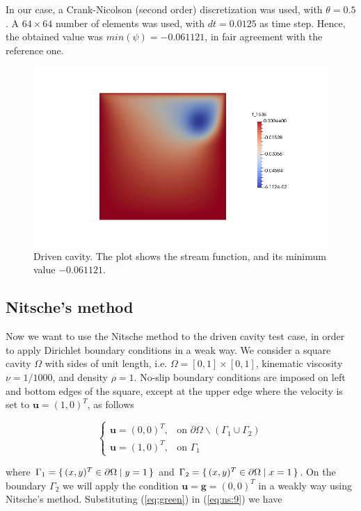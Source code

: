 \documentclass[11pt,a4paper,titlepage]{report}
\begin{document}
In our case, a Crank-Nicolson (second order) discretization was used, with $\theta = 0.5$. A $64 \times 64$ number of elements was used, with $dt = 0.0125$ as time step. Hence, the obtained value was $min(\psi) = -0.061 121$, in fair agreement with the reference one. \\

\vspace{-.3cm}
\begin{figure}[ht]
\centering
\includegraphics[width=\textwidth]{images/mine.png}
\vspace{-1cm}
\caption{Driven cavity. The plot shows the stream function, and its minimum value $-0.061 121$.}
\end{figure}


\subsection{Nitsche's method}
Now we want to use the Nitsche method to the driven cavity test case, in order to apply Dirichlet boundary conditions in a weak way. We consider a square cavity $\Omega$ with sides of unit length, i.e. $\Omega = [0,1] \times [0,1]$, kinematic viscosity $\nu = 1/1000$, and density $\rho = 1$. No-slip boundary conditions are imposed on left and bottom edges of the square, except at the upper edge where the velocity is set to $\mathbf{u} = (1,0)^T$, as follows

\[
\begin{cases}
\mathbf{u} = (0, 0)^T, & \mbox{on } \partial \Omega \backslash (\Gamma_1 \cup \Gamma_2) \\
\mathbf{u} = (1, 0)^T, & \mbox{on } \Gamma_1
\end{cases}
\]

where $ \Gamma_1 = \set{ (x,y)^T \in \partial \Omega | y = 1}$ and
$ \Gamma_2 = \set{ (x,y)^T \in \partial \Omega | x = 1}$. On the boundary $\Gamma_2$ we will apply the condition $\mathbf{u} = \mathbf{g} = (0,0)^T$ in a weakly way using Nitsche's method. Substituting (\ref{eq:green}) in (\ref{eq:ns:9}) we have
\end{document}
